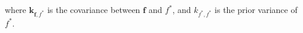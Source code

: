 \documentclass[]{interact}
\theoremstyle{plain}%
\theoremstyle{definition}
\theoremstyle{remark}
\begin{document}
\noindent where $\mathbf{k}_{\mathbf{f},f^*}$ is the covariance between $\mathbf{f}$ and $f^*$, and $k_{f^*,f^*}$ is the prior variance of $f^*$. %


 
\end{document}
